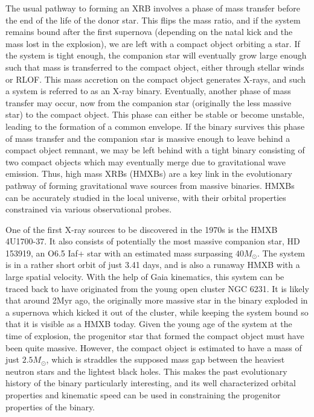 \documentclass[linenumbers,trackchanges,twocolumn]{aastex701}
\begin{document}
The usual pathway to forming an XRB involves a phase of mass transfer before the end of the life of the donor star. This flips the mass ratio, and if the system remains bound after the first supernova (depending on the natal kick and the mass lost in the explosion), we are left with a compact object orbiting a star. If the system is tight enough, the companion star will eventually grow large enough such that mass is transferred to the compact object, either through stellar winds or RLOF. This mass accretion on the compact object generates X-rays, and such a system is referred to as an X-ray binary. Eventually, another phase of mass transfer may occur, now from the companion star (originally the less massive star) to the compact object. This phase can either be stable or become unstable, leading to the formation of a common envelope. If the binary survives this phase of mass transfer and the companion star is massive enough to leave behind a compact object remnant, we may be left behind with a tight binary consisting of two compact objects which may eventually merge due to gravitational wave emission. Thus, high mass XRBs (HMXBs) are a key link in the evolutionary pathway of forming gravitational wave sources from massive binaries. HMXBs can be accurately studied in the local universe, with their orbital properties constrained via various observational probes. 

One of the first X-ray sources to be discovered in the 1970s is the HMXB 4U1700-37. It also consists of potentially the most massive companion star, HD 153919, an O6.5 Iaf+ star with an estimated mass surpassing $40M_{\odot}$. The system is in a rather short orbit of just 3.41 days, and is also a runaway HMXB with a large spatial velocity. With the help of Gaia kinematics, this system can be traced back to have originated from the young open cluster NGC 6231. It is likely that around 2Myr ago, the originally more massive star in the binary exploded in a supernova which kicked it out of the cluster, while keeping the system bound so that it is visible as a HMXB today. Given the young age of the system at the time of explosion, the progenitor star that formed the compact object must have been quite massive. However, the compact object is estimated to have a mass of just $2.5M_{\odot}$, which is straddles the supposed mass gap between the heaviest neutron stars and the lightest black holes. This makes the past evolutionary history of the binary particularly interesting, and its well characterized orbital properties and kinematic speed can be used in constraining the progenitor properties of the binary. 
\end{document}
